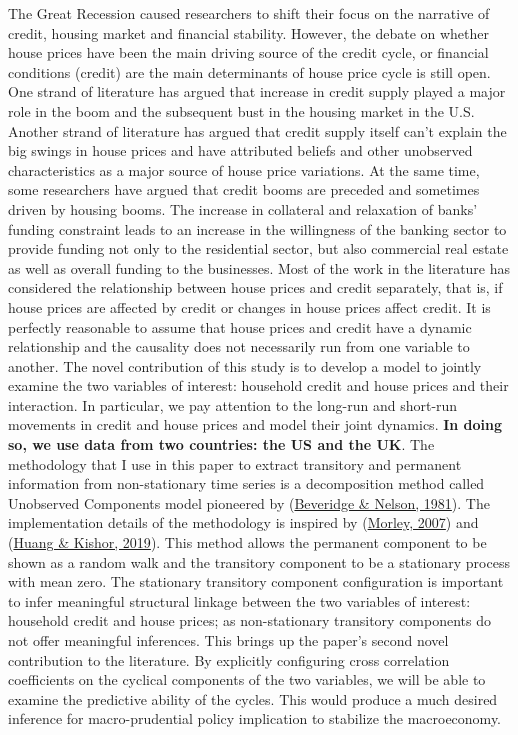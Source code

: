 \documentclass[
  12pt,
]{article}
\begin{document}
The Great Recession caused researchers to shift their focus on the narrative of credit, housing market and financial stability. However, the debate on whether house prices have been the main driving source of the credit cycle, or financial conditions (credit) are the main determinants of house price cycle is still open. One strand of literature has argued that increase in credit supply played a major role in the boom and the subsequent bust in the housing market in the U.S. Another strand of literature has argued that credit supply itself can't explain the big swings in house prices and have attributed beliefs and other unobserved characteristics as a major source of house price variations. At the same time, some researchers have argued that credit booms are preceded and sometimes driven by housing booms. The increase in collateral and relaxation of banks' funding constraint leads to an increase in the willingness of the banking sector to provide funding not only to the residential sector, but also commercial real estate as well as overall funding to the businesses.
Most of the work in the literature has considered the relationship between house prices and credit separately, that is, if house prices are affected by credit or changes in house prices affect credit. It is perfectly reasonable to assume that house prices and credit have a dynamic relationship and the causality does not necessarily run from one variable to another. The novel contribution of this study is to develop a model to jointly examine the two variables of interest: household credit and house prices and their interaction. In particular, we pay attention to the long-run and short-run movements in credit and house prices and model their joint dynamics. \textbf{In doing so, we use data from two countries: the US and the UK}. The methodology that I use in this paper to extract transitory and permanent information from non-stationary time series is a decomposition method called Unobserved Components model pioneered by (\protect\hyperlink{ref-beveridge_new_1981}{Beveridge \& Nelson, 1981}). The implementation details of the methodology is inspired by (\protect\hyperlink{ref-morley_slow_2007}{Morley, 2007}) and (\protect\hyperlink{ref-huang_rise_2019}{Huang \& Kishor, 2019}). This method allows the permanent component to be shown as a random walk and the transitory component to be a stationary process with mean zero. The stationary transitory component configuration is important to infer meaningful structural linkage between the two variables of interest: household credit and house prices; as non-stationary transitory components do not offer meaningful inferences. This brings up the paper's second novel contribution to the literature. By explicitly configuring cross correlation coefficients on the cyclical components of the two variables, we will be able to examine the predictive ability of the cycles. This would produce a much desired inference for macro-prudential policy implication to stabilize the macroeconomy.
\end{document}
